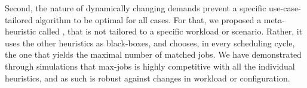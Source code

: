 Second, the nature of dynamically changing demands prevent a specific
use-case-tailored algorithm to be optimal for all cases.
For that, we proposed a meta-heuristic called \maj, that is not
tailored to a specific workload or scenario.
Rather, it uses the other heuristics as black-boxes, and chooses, in
every scheduling cycle, the one that yields the maximal number of
matched jobs.
We have demonstrated through simulations that max-jobs is highly
competitive with all the individual heuristics, and as such is robust
against changes in workload or configuration.



